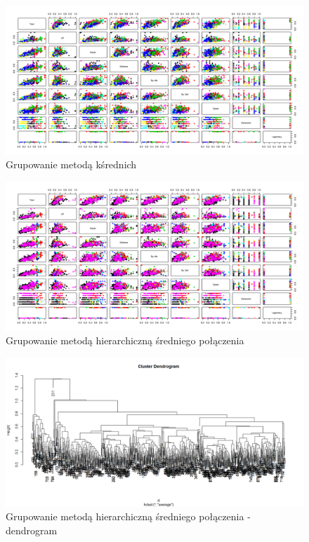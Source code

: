 \documentclass{article}
\begin{document}
\begin{figure}[H]
	\caption{Grupowanie metodą kśrednich}
	\begin{center}
	\includegraphics[width=1\columnwidth]{obrazki/ksrednie} %
	\end{center}
\end{figure}
\begin{figure}[H]
	\caption{Grupowanie metodą hierarchiczną średniego połączenia}
	\begin{center}
	\includegraphics[width=1\columnwidth]{obrazki/graph_average} %
	\end{center}
\end{figure}
\begin{figure}[H]
	\caption{Grupowanie metodą hierarchiczną średniego połączenia - dendrogram}
	\begin{center}
	\includegraphics[width=1\columnwidth]{obrazki/dendrogram_average} %
	\end{center}
\end{figure}
\end{document}
